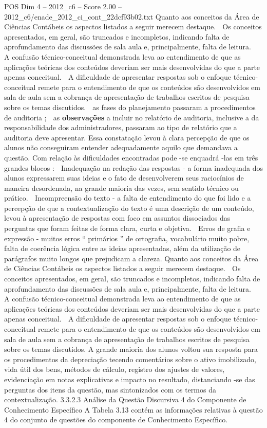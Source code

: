 \begin{textsample}{POS Dim 4 – 2012\_c6 – Score 2.00 – 2012\_c6/enade\_2012\_ci\_cont\_22dcf93b02.txt}
Quanto aos conceitos da Área de Ciências Contábeis os aspectos listados a seguir merecem destaque.  Os conceitos apresentados, em geral, são truncados e incompletos, indicando falta de aprofundamento das discussões de sala aula e, principalmente, falta de leitura.  A confusão técnico-conceitual demonstrada leva ao entendimento de que as aplicações teóricas dos conteúdos deveriam ser mais desenvolvidas do que a parte apenas conceitual.  A dificuldade de apresentar respostas sob o enfoque técnico-conceitual remete para o entendimento de que os conteúdos são desenvolvidos em sala de aula sem a cobrança de apresentação de trabalhos escritos de pesquisa sobre os temas discutidos.  as fases do planejamento passaram a procedimentos de auditoria ;  as \textbf{observações} a incluir no relatório de auditoria, inclusive a da responsabilidade dos administradores, passaram ao tipo de relatório que a auditoria deve apresentar.
Essa constatação levou à clara percepção de que os alunos não conseguiram entender adequadamente aquilo que demandava a questão.
Com relação às dificuldades encontradas pode -se enquadrá -las em três grandes blocos :  Inadequação na redação das respostas - a forma inadequada dos alunos expressarem suas ideias e o fato de desenvolverem seus raciocínios de maneira desordenada, na grande maioria das vezes, sem sentido técnico ou prático.  Incompreensão do texto - a falta de entendimento do que foi lido e a percepção de que a contextualização do texto é uma descrição de um conteúdo, levou à apresentação de respostas com foco em assuntos dissociados das perguntas que foram feitas de forma clara, curta e objetiva.  Erros de grafia e expressão - muitos erros “ primários ” de ortografia, vocabulário muito pobre, falta de coerência lógica entre as ideias apresentadas, além da utilização de parágrafos muito longos que prejudicam a clareza.
Quanto aos conceitos da Área de Ciências Contábeis os aspectos listados a seguir merecem destaque.  Os conceitos apresentados, em geral, são truncados e incompletos, indicando falta de aprofundamento das discussões de sala aula e, principalmente, falta de leitura.  A confusão técnico-conceitual demonstrada leva ao entendimento de que as aplicações teóricas dos conteúdos deveriam ser mais desenvolvidas do que a parte apenas conceitual.  A dificuldade de apresentar respostas sob o enfoque técnico-conceitual remete para o entendimento de que os conteúdos são desenvolvidos em sala de aula sem a cobrança de apresentação de trabalhos escritos de pesquisa sobre os temas discutidos.
A grande maioria dos alunos voltou sua resposta para os procedimentos da depreciação tecendo comentários sobre o ativo imobilizado, vida útil dos bens, métodos de cálculo, registro dos ajustes de valores, evidenciação em notas explicativas e impacto no resultado, distanciando -se das perguntas dos itens da questão, mas sintonizados com os termos da contextualização. 3.3.2.3 Análise da Questão Discursiva 4 do Componente de Conhecimento Específico A Tabela 3.13 contém as informações relativas à questão 4 do conjunto de questões do componente de Conhecimento Específico.

\end{textsample}
